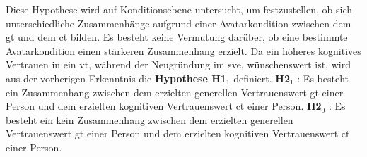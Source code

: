\documentclass[a4paper,11pt]{article}%
\renewcommand{\\}{\vspace*{0.5\baselineskip} \newline}
\begin{document}
Diese Hypothese wird auf Konditionsebene untersucht, um festzustellen, ob sich unterschiedliche Zusammenhänge aufgrund einer Avatarkondition zwischen dem \ac{gt} und dem \ac{ct} bilden.
Es besteht keine Vermutung darüber, ob eine bestimmte Avatarkondition einen stärkeren Zusammenhang erzielt. \newline
Da ein höheres kognitives Vertrauen in ein \ac{vt}, während der Neugründung im \ac{sve}, wünschenswert ist, wird aus der vorherigen Erkenntnis die \textbf{Hypothese H1$_{1}$} definiert.\\
\textbf{H2$_{1}$} : Es besteht ein Zusammenhang zwischen dem erzielten generellen Vertrauenswert \ac{gt} einer Person und dem erzielten kognitiven Vertrauenswert \ac{ct} einer Person. \newline
\textbf{H2$_{0}$} : Es besteht ein kein Zusammenhang zwischen dem erzielten generellen Vertrauenswert \ac{gt} einer Person und dem erzielten kognitiven Vertrauenswert \ac{ct} einer Person.


\end{document}
